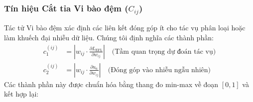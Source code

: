 \documentclass[11pt]{article}
\begin{document}
\subsubsection{Tín hiệu Cắt tỉa Vi bào đệm ($C_{ij}$)}

Tác tử Vi bào đệm xác định các liên kết đóng góp ít cho tác vụ phân loại hoặc làm khuếch đại nhiễu dữ liệu. Chúng tôi định nghĩa các thành phần:
\begin{align}
    c_1^{(ij)} &= \left|w_{ij} \cdot \frac{\partial L_{\text{EFL}}}{\partial w_{ij}}\right| \quad \text{(Tầm quan trọng dự đoán tác vụ)} \\
    c_2^{(ij)} &= \left|w_{ij} \cdot \frac{\partial u_a}{\partial w_{ij}}\right| \quad \text{(Đóng góp vào nhiễu ngẫu nhiên)}
\end{align}
Các thành phần này được chuẩn hóa bằng thang đo min-max về đoạn $[0, 1]$ và kết hợp lại:
\end{document}
